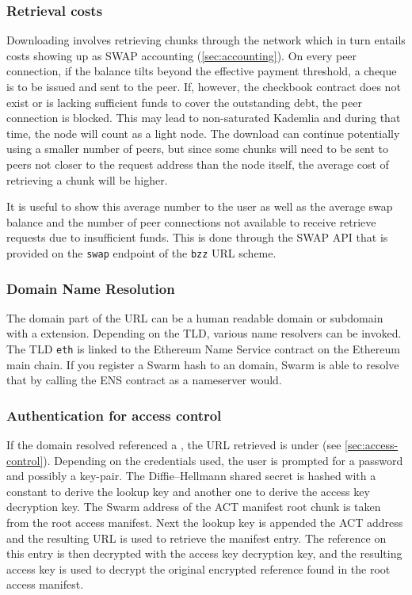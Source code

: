 \subsubsection{Retrieval costs}

Downloading involves retrieving chunks through the network which in turn entails costs showing up as SWAP accounting (\ref{sec:accounting}). On every peer connection, if the balance tilts beyond the effective payment threshold, a cheque is to be issued and sent to the peer. If, however, the checkbook contract does not exist or is lacking sufficient funds to cover the outstanding debt, the peer connection is blocked. This may lead to non-saturated Kademlia and during that time, the node will count as a light node. The download can continue potentially using a smaller number of peers, but since some chunks will need to be sent to peers not closer to the request address than the node itself, the average cost of retrieving a chunk will be higher. 

It is useful to show this average number to the user as well as the average swap balance and the number of peer connections not available to receive retrieve requests due to insufficient funds. This is done through the SWAP API that is provided on the \lstinline{swap} endpoint of the \lstinline{bzz} URL scheme.


\subsubsection{Domain Name Resolution}

The domain part of the URL can be a human readable domain or subdomain with a  extension. Depending on the TLD, various name resolvers can be invoked. The TLD \lstinline{eth} is linked to the Ethereum Name Service contract on the Ethereum main chain. If you register a Swarm hash to an  domain, Swarm is able to resolve that by calling the ENS contract as a nameserver would. 

\subsubsection{Authentication for access control}

If the domain resolved referenced a , the URL retrieved is under  (see \ref{sec:access-control}). 
Depending on the credentials used, the user is prompted for a password and possibly a key-pair. 
The Diffie--Hellmann shared secret is hashed with a constant to derive the lookup key and another one to derive the access key decryption key. The Swarm address of the ACT manifest root chunk is taken from the root access manifest. 
Next the lookup key is appended the ACT address and the resulting URL is used to retrieve the manifest entry. The reference on this entry is then decrypted with the access key decryption key, and the resulting access key is used to decrypt the original encrypted reference found in the root access manifest.

